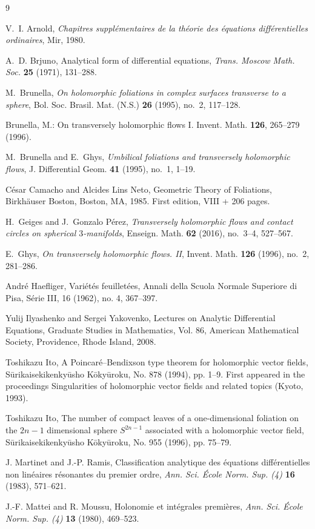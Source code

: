 \documentclass[11pt,reqno]{article}
\theoremstyle{remark}
\begin{document}
\begin{thebibliography}{9}

V.~I. Arnold,
\emph{Chapitres suppl\'ementaires de la th\'eorie des \'equations diff\'erentielles ordinaires},
Mir, 1980.

A.~D. Brjuno,
Analytical form of differential equations,
\emph{Trans. Moscow Math. Soc.} \textbf{25} (1971), 131--288.

M.~Brunella,
\emph{On holomorphic foliations in complex surfaces transverse to a sphere},
Bol. Soc. Brasil. Mat. (N.S.) \textbf{26} (1995), no.~2, 117--128.

Brunella, M.: On transversely holomorphic flows I.
Invent. Math. \textbf{126}, 265--279 (1996).

M.~Brunella and E.~Ghys,
\emph{Umbilical foliations and transversely holomorphic flows},
J. Differential Geom. \textbf{41} (1995), no.~1, 1--19.

 César Camacho and Alcides Lins Neto, Geometric Theory of Foliations, Birkhäuser Boston, Boston, MA, 1985. First edition, VIII + 206 pages.

H.~Geiges and J.~Gonzalo P\'erez,
\emph{Transversely holomorphic flows and contact circles on spherical $3$-manifolds},
Enseign. Math. \textbf{62} (2016), no.~3--4, 527--567.

E.~Ghys,
\emph{On transversely holomorphic flows. II},
Invent. Math. \textbf{126} (1996), no.~2, 281--286.

 André Haefliger, Variétés feuilletées,
Annali della Scuola Normale Superiore di Pisa, Série III, 16 (1962), no. 4, 367–397.

 Yulij Ilyashenko and Sergei Yakovenko, Lectures on Analytic Differential Equations, Graduate Studies in Mathematics, Vol. 86, American Mathematical Society, Providence, Rhode Island, 2008.

 Toshikazu Ito, A Poincaré–Bendixson type theorem for holomorphic vector fields, Sūrikaisekikenkyūsho Kōkyūroku, No. 878 (1994), pp. 1–9. First  appeared in the proceedings Singularities of holomorphic vector fields and related topics (Kyoto, 1993).

 Toshikazu Ito, The number of compact leaves of a one-dimensional foliation on the $2n-1$ dimensional sphere $S^{2n-1}$ associated with a holomorphic vector field, Sūrikaisekikenkyūsho Kōkyūroku, No. 955 (1996), pp. 75--79.

J. Martinet and J.-P. Ramis,
Classification analytique des \'equations diff\'erentielles non lin\'eaires r\'esonantes du premier ordre,
\emph{Ann. Sci. \'Ecole Norm. Sup. (4)} \textbf{16} (1983), 571--621.

J.-F. Mattei and R. Moussu,
Holonomie et int\'egrales premi\`eres,
\emph{Ann. Sci. \'Ecole Norm. Sup. (4)} \textbf{13} (1980), 469--523.

\end{thebibliography}
\end{document}
